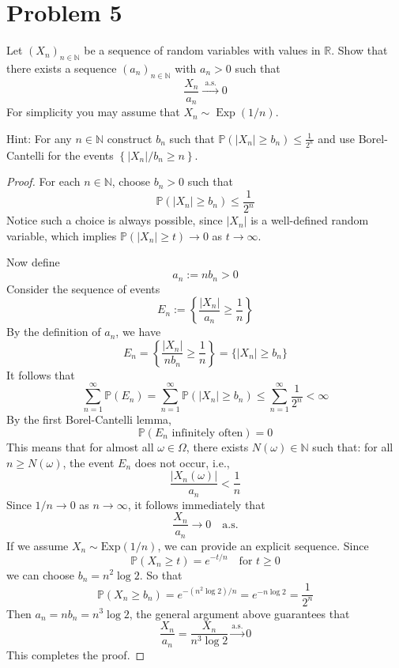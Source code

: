 \section*{Problem 5}
Let $\left(X_n\right)_{n \in \mathbb{N}}$ be a sequence of random variables 
with values in $\mathbb{R}$. 
Show that there exists a sequence $\left(a_n\right)_{n \in \mathbb{N}}$ with $a_n>0$ such that
$$
\frac{X_n}{a_n} \xrightarrow{\text { a.s. }} 0
$$
For simplicity you may assume that $X_n \sim \operatorname{Exp}(1 / n)$.

Hint: For any $n \in \mathbb{N}$ construct $b_n$ such that 
$\mathbb{P}\left(\left|X_n\right| \geq b_n\right) \leq \frac{1}{2^n}$ 
and use Borel-Cantelli for the events $\left\{\left|X_n\right| / b_n \geq n\right\}$.


\begin{proof}
For each $n\in\mathbb{N}$, choose $b_n>0$ such that
$$
\mathbb{P}(|X_n|\ge b_n)\le \frac{1}{2^n}
$$
Notice such a choice is always possible, since $|X_n|$ is a well-defined 
random variable, which implies $\mathbb{P}(|X_n|\ge t)\to 0$ as $t\to\infty$.

Now define
$$a_n := n b_n > 0$$
Consider the sequence of events
$$
E_n := \left\{ \frac{|X_n|}{a_n} \ge \frac{1}{n} \right\}
$$
By the definition of $a_n$, we have
$$
E_n = \left\{ \frac{|X_n|}{n b_n} \ge \frac{1}{n} \right\} 
= \{ |X_n| \ge b_n \}
$$
It follows that
$$
\sum_{n=1}^\infty \mathbb{P}(E_n) =
 \sum_{n=1}^\infty \mathbb{P}(|X_n| \ge b_n) \le 
 \sum_{n=1}^\infty \frac{1}{2^n} < \infty
$$
By the first Borel-Cantelli lemma,
$$
\mathbb{P}(E_n \text{ infinitely often}) = 0
$$
This means that for almost all $\omega \in \Omega$, 
there exists $N(\omega) \in \mathbb{N}$ such that: for all 
$n \ge N(\omega)$, the event $E_n$ does not occur, 
i.e.,
$$\frac{|X_n(\omega)|}{a_n} < \frac{1}{n}
$$
Since $1/n \to 0$ as $n \to \infty$, it follows immediately that
$$
\frac{X_n}{a_n} \to 0 \quad \text{a.s.}
$$
If we assume $X_n \sim \mathrm{Exp}(1/n)$, 
we can provide an explicit sequence. 
Since
$$
\mathbb{P}(X_n \ge t) = e^{-t/n} \quad \text{for } t \ge 0
$$
we can choose $b_n = n^2 \log 2$. So that
$$
\mathbb{P}(X_n \ge b_n) = e^{-(n^2 \log 2)/n} = e^{-n \log 2} = \frac{1}{2^n}
$$
Then $a_n = n b_n = n^3 \log 2$, the general argument above guarantees that
$$
\frac{X_n}{a_n} = 
\frac{X_n}{n^3 \log 2} \xrightarrow{\text{a.s.}} 0
$$
This completes the proof.
\end{proof}







